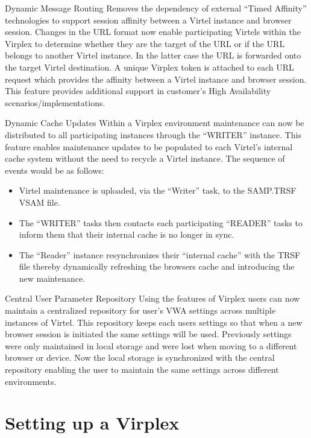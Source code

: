 \documentclass[letterpaper,10pt,english]{sphinxmanual}
\begin{document}
\sphinxAtStartPar
Dynamic Message Routing
Removes the dependency of external “Timed Affinity” technologies to support session affinity between a Virtel instance and browser session. Changes in the URL format now enable participating Virtels within the Virplex to determine whether they are the target of the URL or if the URL belongs to another Virtel instance. In the latter case the URL is forwarded onto the target Virtel destination. A unique Virplex token is attached to each URL request which provides the affinity between a Virtel instance and browser session. This feature provides additional support in customer’s High Availability scenarios/implementations.

\sphinxAtStartPar
Dynamic Cache Updates
Within a Virplex environment maintenance can now be distributed to all participating instances through the “WRITER” instance. This feature enables maintenance updates to be populated to each Virtel’s internal cache system without the need to recycle a Virtel instance. The sequence of events would be as follows:\sphinxhyphen{}
\begin{itemize}
\item {} 
\sphinxAtStartPar
Virtel maintenance is uploaded, via the “Writer” task, to the SAMP.TRSF VSAM file.

\item {} 
\sphinxAtStartPar
The “WRITER” tasks then contacts each participating “READER” tasks to inform them that their internal cache is no longer in sync.

\item {} 
\sphinxAtStartPar
The “Reader” instance resynchronizes their “internal cache” with the TRSF file thereby dynamically refreshing the browsers cache and introducing the new maintenance.

\end{itemize}

\sphinxAtStartPar
Central User Parameter Repository
Using the features of Virplex users can now maintain a centralized repository for user’s VWA settings across multiple instances of Virtel. This repository keeps each users settings so that when a new browser session is initiated the same settings will be used. Previously settings were only maintained in local storage and were lost when moving to a different browser or device. Now the local storage is synchronized with the central repository enabling the user to maintain the same settings across different environments.


\section{Setting up a Virplex}
\label{\detokenize{connectivity_guide:setting-up-a-virplex}}
\sphinxAtStartPar
{}
\end{document}
